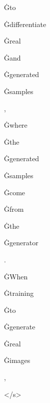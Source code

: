 \documentclass[varwidth]{standalone}
\begin{document}
\begin{CJK*}{UTF8}{gbsn}
{{{\colorbox{red!0.0}{\strut Ġto} \colorbox{red!0.0}{\strut Ġdifferentiate} \colorbox{red!0.0}{\strut Ġreal} \colorbox{red!2.151526}{\strut Ġand} \colorbox{red!0.0}{\strut Ġgenerated} \colorbox{red!0.0}{\strut Ġsamples} \colorbox{red!0.0}{\strut ,} \colorbox{red!0.0}{\strut Ġwhere} \colorbox{red!0.0}{\strut Ġthe} \colorbox{red!0.0}{\strut Ġgenerated} \colorbox{red!0.0}{\strut Ġsamples} \colorbox{red!0.0}{\strut Ġcome} \colorbox{red!0.0}{\strut Ġfrom} \colorbox{red!0.0}{\strut Ġthe} \colorbox{red!0.0}{\strut Ġgenerator} \colorbox{red!2.5627608}{\strut .} \colorbox{red!0.0}{\strut ĠWhen} \colorbox{red!4.178868}{\strut Ġtraining} \colorbox{red!2.6645732}{\strut Ġto} \colorbox{red!2.6087897}{\strut Ġgenerate} \colorbox{red!0.0}{\strut Ġreal} \colorbox{red!3.8569145}{\strut Ġimages} \colorbox{red!0.0}{\strut ,} \colorbox{red!0.0}{\strut </s>} 
}}}
\end{CJK*}
\end{document}
